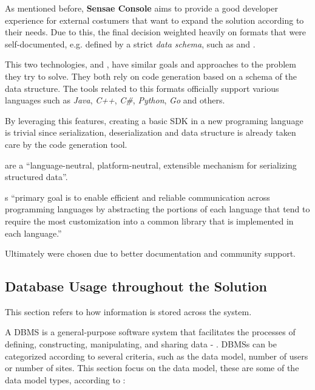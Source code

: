 As mentioned before, \textbf{Sensae Console} aims to provide a good developer experience for external costumers that want to expand the solution according to their needs. Due to this, the final decision weighted heavily on formats that were self-documented, e.g. defined by a strict \textit{data schema}, such as  and .

This two technologies,  and , have similar goals and approaches to the problem they try to solve. They both rely on code generation based on a schema of the data structure. The tools related to this formats officially support various languages such as \textit{Java}, \textit{C++}, \textit{C\#}, \textit{Python}, \textit{Go} and others. 

By leveraging this features, creating a basic \gls{SDK} in a new programing language is trivial since serialization, deserialization and data structure is already taken care by the code generation tool.

 are a ``language-neutral, platform-neutral, extensible mechanism for serializing structured data''.

s ``primary goal is to enable efficient and reliable communication across programming languages by abstracting the portions of each language that tend to require the most customization into a common library that is implemented in each language.''

Ultimately  were chosen due to better documentation and community support.


\subsection{Database Usage throughout the Solution}
\label{subsec:implementation:decisions:database}

This section refers to how information is stored across the system.

A \gls{DBMS} is a general-purpose software system that facilitates the processes of defining, constructing, manipulating, and sharing data - . \gls{DBMS}s can be categorized according to several criteria, such as the data model, number of users or number of sites. This section focus on the data model, these are some of the data model types, according to \cite{elmasri2000fundamentals}: 

